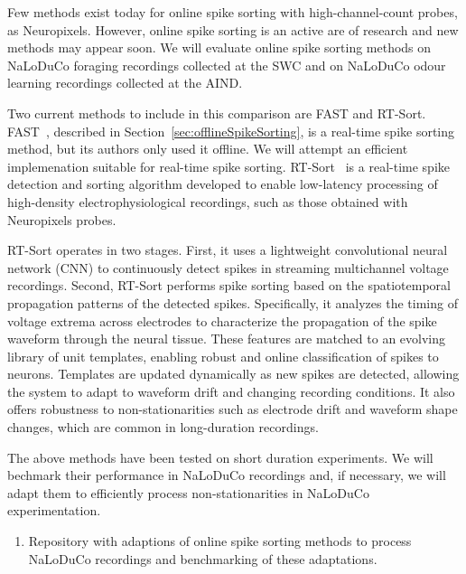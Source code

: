 
Few methods exist today for online spike sorting with high-channel-count
probes, as Neuropixels. However, online spike sorting is an active are of
research and new methods may appear soon. We will evaluate online spike sorting
methods on NaLoDuCo foraging recordings collected at the SWC and on NaLoDuCo
odour learning recordings collected at the AIND.

Two current methods to include in this comparison are
FAST and RT-Sort.
%
FAST~\citep{dhawaleEtAl17}, described in Section~\ref{sec:offlineSpikeSorting},
is a real-time spike sorting method, but its authors only used it offline. We
will attempt an efficient implemenation suitable for real-time spike sorting.
%
RT-Sort~\citep{vanDerMolenEtAl24} is a real-time spike detection and
sorting algorithm developed to enable low-latency processing of high-density
electrophysiological recordings, such as those obtained with Neuropixels
probes.

RT-Sort operates in two stages. First, it uses a lightweight
convolutional neural network (CNN) to continuously detect spikes in
streaming multichannel voltage recordings.
%
Second, RT-Sort performs spike sorting based on the spatiotemporal
propagation patterns of the detected spikes. Specifically, it analyzes the
timing of voltage extrema across electrodes to characterize the propagation of
the spike waveform through the neural tissue. These features are matched to an
evolving library of unit templates, enabling robust and online classification
of spikes to neurons. Templates are updated dynamically as new spikes are
detected, allowing the system to adapt to waveform drift and changing recording
conditions.
%
It also offers robustness to non-stationarities such as
electrode drift and waveform shape changes, which are common in long-duration
recordings.

The above methods have been tested on short duration experiments. We will
bechmark their performance in NaLoDuCo recordings and, if necessary, we will
adapt them to efficiently process non-stationarities in NaLoDuCo
experimentation.


\begin{enumerate}

    \item Repository with adaptions of online spike sorting methods to process
    NaLoDuCo recordings and benchmarking of these adaptations.

\end{enumerate}

